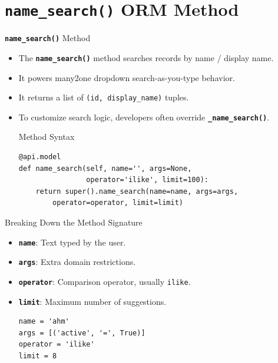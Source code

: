 
\section{\textbf{\texttt{name\_search()}} ORM Method}

\begin{frame}[fragile]{\textbf{\texttt{name\_search()}} Method}
	\begin{itemize}
		\item The \textbf{\texttt{name\_search()}} method searches records by name / display name.
		\item It powers many2one dropdown search-as-you-type behavior.
		\item It returns a list of \texttt{(id, display\_name)} tuples.
		\item To customize search logic, developers often override \textbf{\texttt{\_name\_search()}}.
\begin{block}{Method Syntax}
\begin{lstlisting}
@api.model
def name_search(self, name='', args=None,
				operator='ilike', limit=100):
	return super().name_search(name=name, args=args,
		operator=operator, limit=limit)
\end{lstlisting}
\end{block}
	\end{itemize}
\end{frame}

\begin{frame}[fragile]{Breaking Down the Method Signature}
	\begin{block}{}
		\begin{itemize}
			\item \textbf{\texttt{name}}: Text typed by the user.
			\item \textbf{\texttt{args}}: Extra domain restrictions.
			\item \textbf{\texttt{operator}}: Comparison operator, usually \texttt{ilike}.
			\item \textbf{\texttt{limit}}: Maximum number of suggestions.
\begin{lstlisting}
name = 'ahm'
args = [('active', '=', True)]
operator = 'ilike'
limit = 8
\end{lstlisting}
		\end{itemize}
	\end{block}
\end{frame}

